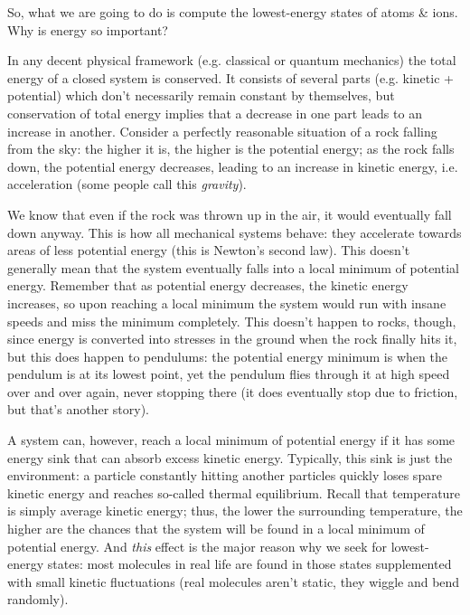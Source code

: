 \documentclass{article}
\begin{document}
So, what we are going to do is compute the lowest-energy states of atoms \& ions. Why is energy so important?

In any decent physical framework (e.g. classical or quantum mechanics) the total energy of a closed system is conserved. It consists of several parts (e.g. kinetic + potential) which don't necessarily remain constant by themselves, but conservation of total energy implies that a decrease in one part leads to an increase in another. Consider a perfectly reasonable situation of a rock falling from the sky: the higher it is, the higher is the potential energy; as the rock falls down, the potential energy decreases, leading to an increase in kinetic energy, i.e. acceleration (some people call this \textit{gravity}).

We know that even if the rock was thrown up in the air, it would eventually fall down anyway. This is how all mechanical systems behave: they accelerate towards areas of less potential energy (this is Newton's second law). This doesn't generally mean that the system eventually falls into a local minimum of potential energy. Remember that as potential energy decreases, the kinetic energy increases, so upon reaching a local minimum the system would run with insane speeds and miss the minimum completely. This doesn't happen to rocks, though, since energy is converted into stresses in the ground when the rock finally hits it, but this does happen to pendulums: the potential energy minimum is when the pendulum is at its lowest point, yet the pendulum flies through it at high speed over and over again, never stopping there (it does eventually stop due to friction, but that's another story).

A system can, however, reach a local minimum of potential energy if it has some energy sink that can absorb excess kinetic energy. Typically, this sink is just the environment: a particle constantly hitting another particles quickly loses spare kinetic energy and reaches so-called thermal equilibrium. Recall that temperature is simply average kinetic energy; thus, the lower the surrounding temperature, the higher are the chances that the system will be found in a local minimum of potential energy. And \textit{this} effect is the major reason why we seek for lowest-energy states: most molecules in real life are found in those states supplemented with small kinetic fluctuations (real molecules aren't static, they wiggle and bend randomly).
\end{document}
